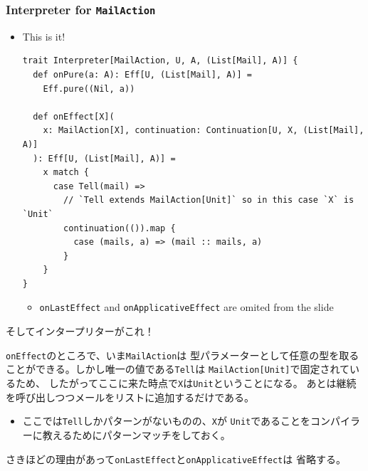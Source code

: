 \begin{frame}[fragile]
  \frametitle{Interpreter for \lstinline|MailAction|}

  \begin{itemize}
    \item This is it!
\begin{lstlisting}[style=scala]
trait Interpreter[MailAction, U, A, (List[Mail], A)] {
  def onPure(a: A): Eff[U, (List[Mail], A)] =
    Eff.pure((Nil, a))

  def onEffect[X](
    x: MailAction[X], continuation: Continuation[U, X, (List[Mail], A)]
  ): Eff[U, (List[Mail], A)] =
    x match {
      case Tell(mail) =>
        // `Tell extends MailAction[Unit]` so in this case `X` is `Unit`
        continuation(()).map {
          case (mails, a) => (mail :: mails, a)
        }
    }
}
\end{lstlisting}
    \begin{itemize}
      \item \lstinline|onLastEffect| and \lstinline|onApplicativeEffect|
      are omited from the slide
    \end{itemize}
  \end{itemize}

  \begin{notes}
    \item そしてインタープリターがこれ！

    \item \lstinline|onEffect|のところで、いま\lstinline|MailAction|は
    型パラメーターとして任意の型を取ることができる。しかし唯一の値である\lstinline|Tell|は
    \lstinline|MailAction[Unit]|で固定されているため、
    したがってここに来た時点で\lstinline|X|は\lstinline|Unit|ということになる。
    あとは継続を呼び出しつつメールをリストに追加するだけである。
    \begin{itemize}
      \item ここでは\lstinline|Tell|しかパターンがないものの、\lstinline|X|が
      \lstinline|Unit|であることをコンパイラーに教えるためにパターンマッチをしておく。
    \end{itemize}

    \item さきほどの理由があって\lstinline|onLastEffect|と\lstinline|onApplicativeEffect|は
    省略する。
  \end{notes}
\end{frame}

